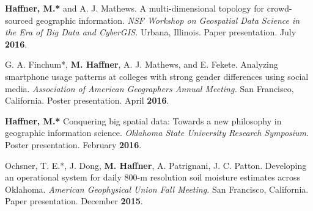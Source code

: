 \begin{cventries}
   \cventry
      {}
      {}
      {}
      {}
      {
        \begin{cvitems}
          \vspace{-2mm}
        \item {\textbf{Haffner, M.*} and A. J. Mathews. A multi-dimensional
            topology for crowd-sourced geographic information. \textit{NSF
              Workshop on Geospatial Data Science in the Era of Big Data and
              CyberGIS.} Urbana, Illinois. Paper presentation. July
            \textbf{2016}.}
          \end{cvitems}
        }

   \cventry
      {}
      {}
      {}
      {}
      {
        \begin{cvitems}
          \vspace{-2mm}
        \item G. A. Finchum*, {\textbf{M. Haffner}, A. J. Mathews, and E.
            Fekete. Analyzing smartphone usage patterns at colleges with strong
            gender differences using social media. \textit{Association of
              American Geographers Annual Meeting.} San Francisco, California.
            Poster presentation. April \textbf{2016}.}
            \end{cvitems}
            }

   \cventry
      {}
      {}
      {}
      {}
      {
        \begin{cvitems}
          \vspace{-2mm}
        \item {\textbf{Haffner, M.*} Conquering big spatial data: Towards a new
            philosophy in geographic information science. \textit{Oklahoma State
              University Research Symposium}. Poster presentation. February
            \textbf{2016}.}
              \end{cvitems}
            }

   \cventry
      {}
      {}
      {}
      {}
      {
        \begin{cvitems}
          \vspace{-2mm}
        \item {Ochsner, T. E.*, J. Dong, \textbf{M. Haffner}, A. Patrignani, J.
            C. Patton. Developing an operational system for daily 800-m
            resolution soil moisture estimates across Oklahoma. \textit{American
              Geophysical Union Fall Meeting.} San Francisco, California. Paper
            presentation. December \textbf{2015}.}
            \end{cvitems}
            }


\end{cventries}
